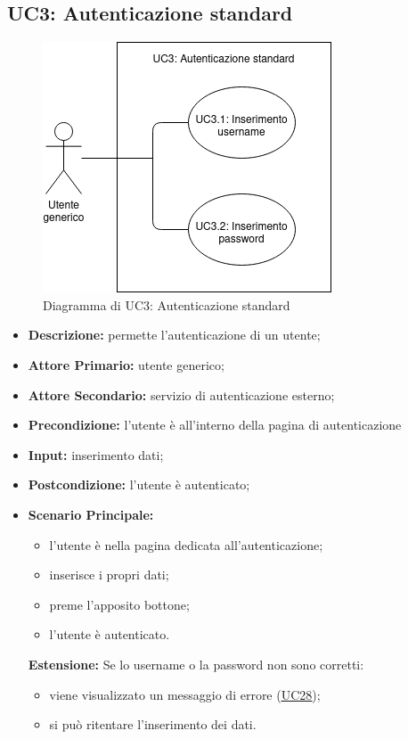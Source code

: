 \subsection{UC3: Autenticazione standard}
\begin{figure}[!ht]
    \caption{Diagramma di UC3: Autenticazione standard}
    \vspace{10px}
    \includegraphics[scale=0.5]{../../../Images/AnalisiRequisiti/UC03}
    \centering
\end{figure}
\label{sec:UC3}
\begin{itemize}
    \item \textbf{Descrizione:} permette l'autenticazione di un utente;
    \item \textbf{Attore Primario:} utente generico;
    \item \textbf{Attore Secondario:} servizio di autenticazione esterno;
    \item \textbf{Precondizione:} l'utente è all'interno della pagina di autenticazione
    \item \textbf{Input:} inserimento dati;
    \item \textbf{Postcondizione:} l'utente è autenticato;
    \item \textbf{Scenario Principale:}
          \begin{itemize}
              \item l'utente è nella pagina dedicata all'autenticazione;
              \item inserisce i propri dati;
              \item preme l'apposito bottone;
              \item l'utente è autenticato.
          \end{itemize}
          \textbf{Estensione:}
          Se lo username o la password non sono corretti:
          \begin{itemize}
              \item viene visualizzato un messaggio di errore (\hyperref[sec:UC28]{\underline{UC28}});
              \item si può ritentare l'inserimento dei dati.
          \end{itemize}
\end{itemize}
